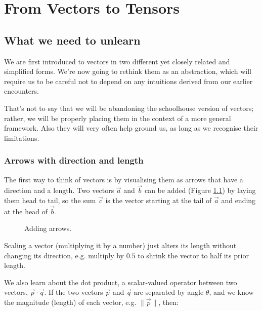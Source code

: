 \chapter{From Vectors to Tensors} \label{ch:vectors}

\section{What we need to unlearn}

We are first introduced to vectors in two different yet closely related and simplified forms. We're now going to rethink them as an abstraction, which will require us to be careful not to depend on any intuitions derived from our earlier encounters.

That's not to say that we will be abandoning the schoolhouse version of vectors; rather, we will be properly placing them in the context of a more general framework. Also they will very often help ground us, as long as we recognise their limitations.

\subsection{Arrows with direction and length}

The first way to think of vectors is by visualising them as arrows that have a direction and a length. Two vectors $\vec{a}$ and $\vec{b}$ can be added (Figure \ref{fig:vector-addition}) by laying them head to tail, so the sum $\vec{c}$ is the vector starting at the tail of $\vec{a}$ and ending at the head of $\vec{b}$.

\begin{figure}[h]
    \centering
    \caption{Adding arrows.} \label{fig:vector-addition}
\end{figure}

Scaling a vector (multiplying it by a number) just alters its length without changing its direction, e.g. multiply by $0.5$ to shrink the vector to half its prior length.

We also learn about the dot product, a scalar-valued operator between two vectors, $\vec{p}\cdot\vec{q}$. If the two vectors $\vec{p}$ and $\vec{q}$ are separated by angle $\theta$, and we know the magnitude (length) of each vector, e.g. $\|\vec{p}\|$, then:


